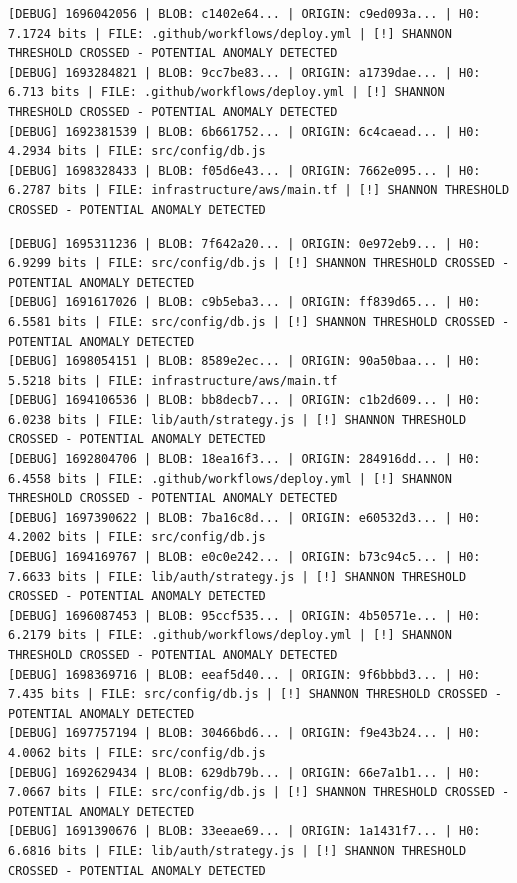 \documentclass[12pt, a4paper, oneside]{report}
\begin{document}
\begin{lstlisting}[basicstyle=\tiny\ttfamily]
[DEBUG] 1696042056 | BLOB: c1402e64... | ORIGIN: c9ed093a... | H0: 7.1724 bits | FILE: .github/workflows/deploy.yml | [!] SHANNON THRESHOLD CROSSED - POTENTIAL ANOMALY DETECTED
[DEBUG] 1693284821 | BLOB: 9cc7be83... | ORIGIN: a1739dae... | H0: 6.713 bits | FILE: .github/workflows/deploy.yml | [!] SHANNON THRESHOLD CROSSED - POTENTIAL ANOMALY DETECTED
[DEBUG] 1692381539 | BLOB: 6b661752... | ORIGIN: 6c4caead... | H0: 4.2934 bits | FILE: src/config/db.js
[DEBUG] 1698328433 | BLOB: f05d6e43... | ORIGIN: 7662e095... | H0: 6.2787 bits | FILE: infrastructure/aws/main.tf | [!] SHANNON THRESHOLD CROSSED - POTENTIAL ANOMALY DETECTED
\end{lstlisting}
\newpage
\begin{lstlisting}[basicstyle=\tiny\ttfamily]
[DEBUG] 1695311236 | BLOB: 7f642a20... | ORIGIN: 0e972eb9... | H0: 6.9299 bits | FILE: src/config/db.js | [!] SHANNON THRESHOLD CROSSED - POTENTIAL ANOMALY DETECTED
[DEBUG] 1691617026 | BLOB: c9b5eba3... | ORIGIN: ff839d65... | H0: 6.5581 bits | FILE: src/config/db.js | [!] SHANNON THRESHOLD CROSSED - POTENTIAL ANOMALY DETECTED
[DEBUG] 1698054151 | BLOB: 8589e2ec... | ORIGIN: 90a50baa... | H0: 5.5218 bits | FILE: infrastructure/aws/main.tf
[DEBUG] 1694106536 | BLOB: bb8decb7... | ORIGIN: c1b2d609... | H0: 6.0238 bits | FILE: lib/auth/strategy.js | [!] SHANNON THRESHOLD CROSSED - POTENTIAL ANOMALY DETECTED
[DEBUG] 1692804706 | BLOB: 18ea16f3... | ORIGIN: 284916dd... | H0: 6.4558 bits | FILE: .github/workflows/deploy.yml | [!] SHANNON THRESHOLD CROSSED - POTENTIAL ANOMALY DETECTED
[DEBUG] 1697390622 | BLOB: 7ba16c8d... | ORIGIN: e60532d3... | H0: 4.2002 bits | FILE: src/config/db.js
[DEBUG] 1694169767 | BLOB: e0c0e242... | ORIGIN: b73c94c5... | H0: 7.6633 bits | FILE: lib/auth/strategy.js | [!] SHANNON THRESHOLD CROSSED - POTENTIAL ANOMALY DETECTED
[DEBUG] 1696087453 | BLOB: 95ccf535... | ORIGIN: 4b50571e... | H0: 6.2179 bits | FILE: .github/workflows/deploy.yml | [!] SHANNON THRESHOLD CROSSED - POTENTIAL ANOMALY DETECTED
[DEBUG] 1698369716 | BLOB: eeaf5d40... | ORIGIN: 9f6bbbd3... | H0: 7.435 bits | FILE: src/config/db.js | [!] SHANNON THRESHOLD CROSSED - POTENTIAL ANOMALY DETECTED
[DEBUG] 1697757194 | BLOB: 30466bd6... | ORIGIN: f9e43b24... | H0: 4.0062 bits | FILE: src/config/db.js
[DEBUG] 1692629434 | BLOB: 629db79b... | ORIGIN: 66e7a1b1... | H0: 7.0667 bits | FILE: src/config/db.js | [!] SHANNON THRESHOLD CROSSED - POTENTIAL ANOMALY DETECTED
[DEBUG] 1691390676 | BLOB: 33eeae69... | ORIGIN: 1a1431f7... | H0: 6.6816 bits | FILE: lib/auth/strategy.js | [!] SHANNON THRESHOLD CROSSED - POTENTIAL ANOMALY DETECTED

\end{lstlisting}
\end{document}
